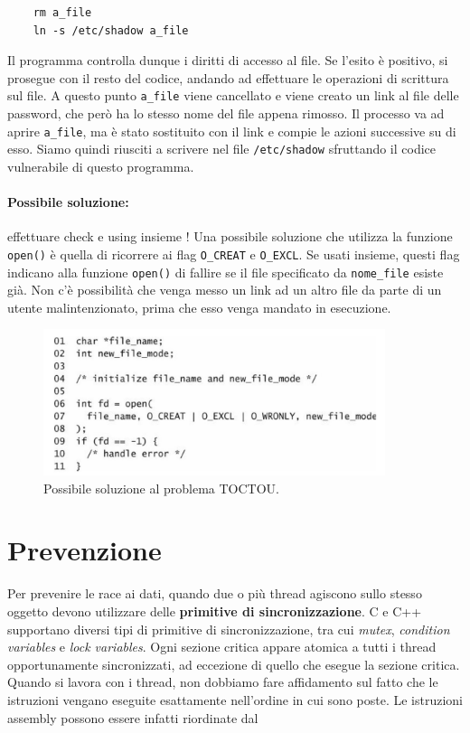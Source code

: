 \begin{lstlisting}
    rm a_file
    ln -s /etc/shadow a_file
\end{lstlisting}

Il programma controlla dunque i diritti di accesso al file.
Se l’esito è positivo, si prosegue con il resto del codice, andando ad effettuare
le operazioni di scrittura sul file.
A questo punto \verb|a_file| viene cancellato e viene creato un link al file delle password,
che però ha lo stesso nome del file appena rimosso. Il processo va ad aprire \verb|a_file|,
ma è stato sostituito con il link e compie le azioni successive su di esso.
Siamo quindi riusciti a scrivere nel file \verb|/etc/shadow| sfruttando il codice
vulnerabile di questo programma.

\paragraph{Possibile soluzione:}
effettuare check e using insieme !
Una possibile soluzione che utilizza la funzione
\verb|open()| è quella di ricorrere ai flag \verb|O_CREAT| e \verb|O_EXCL|.
Se usati insieme, questi flag indicano alla funzione \verb|open()| di fallire
se il file specificato da \verb|nome_file| esiste già.
Non c’è possibilità che venga messo un link ad un altro file da parte di un
utente malintenzionato, prima che esso venga mandato in esecuzione.

\begin{figure}
    \centering
    \includegraphics[width=10cm, keepaspectratio]{capitoli/secure_coding/img/cap_6/esempio_open.png}
    \caption{Possibile soluzione al problema TOCTOU.}
\end{figure}

\section{Prevenzione}

Per prevenire le race ai dati, quando due o più thread agiscono sullo stesso
oggetto devono utilizzare delle \textbf{primitive di sincronizzazione}.
C e C++ supportano diversi tipi di primitive di sincronizzazione, tra cui \textit{mutex},
\textit{condition variables} e \textit{lock variables}.
Ogni sezione critica appare atomica a tutti i thread opportunamente sincronizzati,
ad eccezione di quello che esegue la sezione critica.
Quando si lavora con i thread, non dobbiamo fare affidamento sul fatto che le istruzioni
vengano eseguite
esattamente nell’ordine in cui sono poste.
Le istruzioni assembly possono essere infatti riordinate dal

